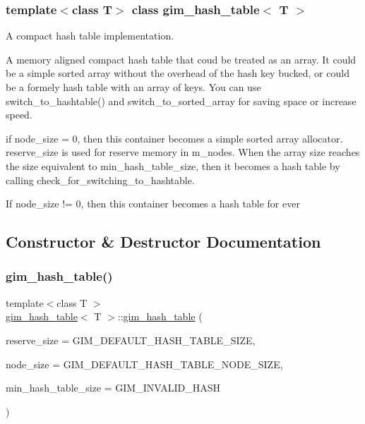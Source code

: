\subsubsection*{template$<$class T$>$\newline
class gim\+\_\+hash\+\_\+table$<$ T $>$}

A compact hash table implementation. 

A memory aligned compact hash table that coud be treated as an array. It could be a simple sorted array without the overhead of the hash key bucked, or could be a formely hash table with an array of keys. You can use switch\+\_\+to\+\_\+hashtable() and switch\+\_\+to\+\_\+sorted\+\_\+array for saving space or increase speed. 


\begin{DoxyItemize}
\item if node\+\_\+size = 0, then this container becomes a simple sorted array allocator. reserve\+\_\+size is used for reserve memory in m\+\_\+nodes. When the array size reaches the size equivalent to \textquotesingle{}min\+\_\+hash\+\_\+table\+\_\+size\textquotesingle{}, then it becomes a hash table by calling check\+\_\+for\+\_\+switching\+\_\+to\+\_\+hashtable. 
\item If node\+\_\+size != 0, then this container becomes a hash table for ever 
\end{DoxyItemize}

\subsection{Constructor \& Destructor Documentation}
\mbox{\label{classgim__hash__table_aefe21c907c69c8077ec0886aaa778f6f}} 
\subsubsection{\texorpdfstring{gim\+\_\+hash\+\_\+table()}{gim\_hash\_table()}\hspace{0.1cm}{\footnotesize\ttfamily [1/2]}}
{\footnotesize\ttfamily template$<$class T $>$ \\
\hyperlink{classgim__hash__table}{gim\+\_\+hash\+\_\+table}$<$ T $>$\+::\hyperlink{classgim__hash__table}{gim\+\_\+hash\+\_\+table} (\begin{DoxyParamCaption}\item[{G\+U\+I\+NT}]{reserve\+\_\+size = {\ttfamily GIM\+\_\+DEFAULT\+\_\+HASH\+\_\+TABLE\+\_\+SIZE},  }\item[{G\+U\+I\+NT}]{node\+\_\+size = {\ttfamily GIM\+\_\+DEFAULT\+\_\+HASH\+\_\+TABLE\+\_\+NODE\+\_\+SIZE},  }\item[{G\+U\+I\+NT}]{min\+\_\+hash\+\_\+table\+\_\+size = {\ttfamily GIM\+\_\+INVALID\+\_\+HASH} }\end{DoxyParamCaption})\hspace{0.3cm}{\ttfamily [inline]}}

